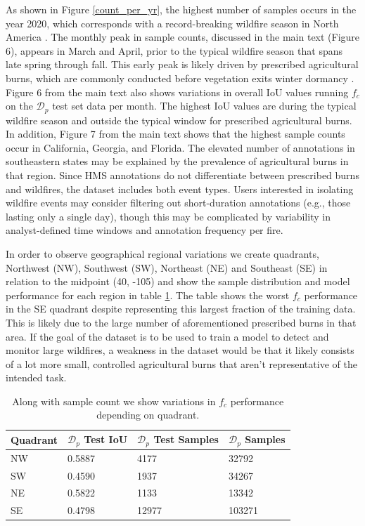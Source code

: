 \documentclass{article}
\begin{document}
As shown in Figure \ref{count_per_yr}, the highest number of samples occurs in the year 2020, which corresponds with a record-breaking wildfire season in North America \cite{fires2020}. The monthly peak in sample counts, discussed in the main text (Figure 6), appears in March and April, prior to the typical wildfire season that spans late spring through fall. This early peak is likely driven by prescribed agricultural burns, which are commonly conducted before vegetation exits winter dormancy \cite{ag_fire}. Figure 6 from the main text also shows variations in overall IoU values running \(f_{c}\) on the \(\mathcal{D}_p\) test set data per month. The highest IoU values are during the typical wildfire season and outside the typical window for prescribed agricultural burns. In addition, Figure 7 from the main text shows that the highest sample counts occur in California, Georgia, and Florida. The elevated number of annotations in southeastern states may be explained by the prevalence of agricultural burns in that region. Since HMS annotations do not differentiate between prescribed burns and wildfires, the dataset includes both event types. Users interested in isolating wildfire events may consider filtering out short-duration annotations (e.g., those lasting only a single day), though this may be complicated by variability in analyst-defined time windows and annotation frequency per fire.

In order to observe geographical regional variations we create quadrants, Northwest (NW), Southwest (SW), Northeast (NE) and Southeast (SE) in relation to the midpoint (40, -105) and show the sample distribution and model performance for each region in table \ref{quad}. The table shows the worst \(f_c\) performance in the SE quadrant despite representing this largest fraction of the training data. This is likely due to the large number of aforementioned prescribed burns in that area. If the goal of the dataset is to be used to train a model to detect and monitor large wildfires, a weakness in the dataset would be that it likely consists of a lot more small, controlled agricultural burns that aren't representative of the intended task. 

\begin{table}
    \caption{Along with sample count we show variations in \(f_{c}\) performance depending on quadrant.}
  \label{quad}
  \centering
  \begin{tabular}{llll}
    \toprule
    Quadrant & \(\mathcal{D}_p\) Test IoU & \(\mathcal{D}_p\) Test Samples & \(\mathcal{D}_p\) Samples \\
    \midrule
    NW & 0.5887 & 4177 & 32792\\
    SW & 0.4590 & 1937 & 34267\\
    NE & 0.5822 & 1133   & 13342\\
    SE & 0.4798 & 12977 & 103271 \\
    \bottomrule
  \end{tabular}
\end{table}
\end{document}
